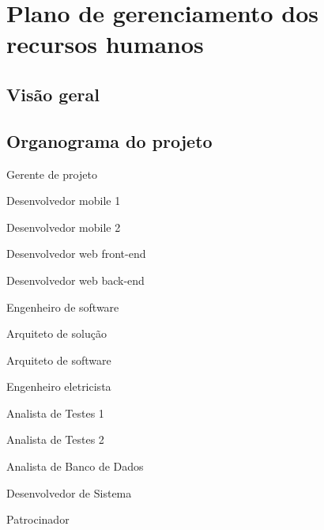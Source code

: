 
\chapter{Plano de gerenciamento dos recursos humanos}
\label{ch:human-resource-management-plan}

\section{Visão geral}


\section{Organograma do projeto}

\item Gerente de projeto
	\item Desenvolvedor mobile 1
	\item Desenvolvedor mobile 2
	\item Desenvolvedor web front-end
	\item Desenvolvedor web back-end
	\item Engenheiro de software
	\item Arquiteto de solução
	\item Arquiteto de software
	\item Engenheiro eletricista
	\item Analista de Testes 1
	\item Analista de Testes 2
	\item Analista de Banco de Dados 
	\item Desenvolvedor de Sistema
	\item Patrocinador

